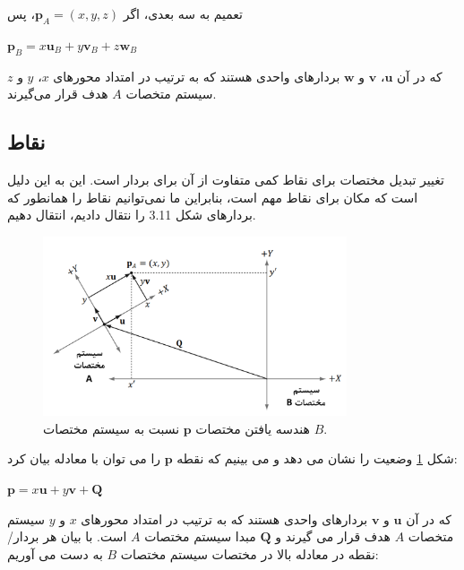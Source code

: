 {\begin{spacing}{1.5}
        تعمیم به سه بعدی، اگر $\textbf{p}_{A}=(x, y, z)$، پس

        \begin{center}
            $\textbf{p}_{B}=x\textbf{u}_{B}+y\textbf{v}_{B}+z\textbf{w}_{B}$
        \end{center}

        که در آن $\textbf{u}$، $\textbf{v}$ و $\textbf{w}$ بردارهای واحدی هستند که به ترتیب در امتداد محورهای $x$، $y$ و $z$ سیستم متخصات $A$ هدف قرار می‌گیرند.
    \end{spacing}
}

\subsection{\textbf{نقاط}}
{
    \Large
    \begin{spacing}{1.5}
        تغییر تبدیل مختصات برای نقاط کمی متفاوت از آن برای بردار است.
        این به این دلیل است که مکان برای نقاط مهم است، بنابراین ما نمی‌توانیم نقاط را همانطور که بردارهای شکل 3.11 را نتقال دادیم، انتقال دهیم.

        \begin{figure}[H]
            \centering
            \setlength{\belowcaptionskip}{-10pt}
            \includegraphics[width=0.8\textwidth]{Images/4/3/4.Session.1.3.12}
            \caption {هندسه یافتن مختصات $\textbf{p}$ نسبت به سیستم مختصات $B$.}
            \label{fig:4.Session.1.3.12}
        \end{figure}

        شکل \ref{fig:4.Session.1.3.12} وضعیت را نشان می دهد و می بینیم که نقطه $\textbf{p}$ را می توان با معادله بیان کرد:

        \begin{center}
            $\textbf{p}=x\textbf{u}+y\textbf{v}+\textbf{Q}$
        \end{center}

        که در آن $\textbf{u}$ و $\textbf{v}$ بردارهای واحدی هستند که به ترتیب در امتداد محورهای $x$ و $y$ سیستم متخصات $A$ هدف قرار می گیرند و $\textbf{Q}$ مبدا سیستم مختصات $A$ است.
        با بیان هر بردار/نقطه در معادله بالا در مختصات سیستم مختصات $B$ به دست می آوریم:


\end{spacing}}

